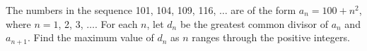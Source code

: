 The numbers in the sequence 101, 104, 109, 116, $\dots$ are of the form $a_n = 100 + n^2$, where $n = 1$, 2, 3, $\dots$.  For each $n$, let $d_n$ be the greatest common divisor of $a_n$ and $a_{n + 1}$.  Find the maximum value of $d_n$ as $n$ ranges through the positive integers.